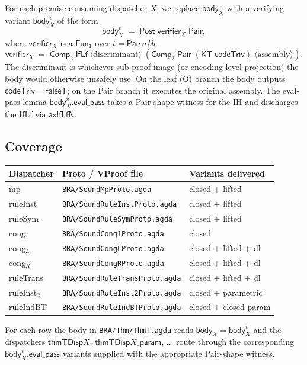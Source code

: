 \documentclass[11pt]{article}
\newcommand{\FunOne}{\mathsf{Fun_1}}
\newcommand{\Pair}{\mathsf{Pair}}
\newcommand{\IfLf}{\mathsf{IfLf}}
\newcommand{\Comp}{\mathsf{Comp}}
\newcommand{\Post}{\mathsf{Post}}
\newcommand{\KT}{\mathsf{KT}}
\newcommand{\codeTriv}{\mathsf{codeTriv}}
\newcommand{\falseT}{\mathsf{falseT}}
\begin{document}
For each premise-consuming dispatcher $X$, we replace
$\mathsf{body}_X$ with a verifying variant
$\mathsf{body}_X^v$ of the form
\[
\mathsf{body}_X^v \;=\; \Post\;\mathsf{verifier}_X\;\Pair,
\]
where $\mathsf{verifier}_X$ is a $\FunOne$ over $t = \Pair\,a\,bb$:
\[
\mathsf{verifier}_X
\;=\;\Comp_2\;\IfLf\;\langle\text{discriminant}\rangle\;
              (\Comp_2\;\Pair\;(\KT\;\codeTriv)\;\langle\text{assembly}\rangle).
\]
The discriminant is whichever sub-proof image (or encoding-level
projection) the body would otherwise unsafely use.  On the leaf
($\mathsf{O}$) branch the body outputs $\codeTriv = \falseT$; on the
Pair branch it executes the original assembly.  The eval-pass lemma
$\mathsf{body}_X^v\!.\mathsf{eval\_pass}$ takes a Pair-shape
witness for the IH and discharges the IfLf via $\mathsf{axIfLfN}$.

\subsection{Coverage}

\begin{center}
\renewcommand{\arraystretch}{1.05}
\begin{tabular}{lll}
\hline
Dispatcher & Proto / VProof file & Variants delivered \\
\hline
mp           & \verb|BRA/SoundMpProto.agda|         & closed + lifted \\
ruleInst     & \verb|BRA/SoundRuleInstProto.agda|   & closed + lifted \\
ruleSym      & \verb|BRA/SoundRuleSymProto.agda|    & closed + lifted \\
cong$_1$     & \verb|BRA/SoundCong1Proto.agda|      & closed \\
cong$_L$     & \verb|BRA/SoundCongLProto.agda|      & closed + lifted + dl \\
cong$_R$     & \verb|BRA/SoundCongRProto.agda|     & closed + lifted + dl \\
ruleTrans    & \verb|BRA/SoundRuleTransProto.agda|  & closed + lifted + dl \\
ruleInst$_2$ & \verb|BRA/SoundRuleInst2Proto.agda|  & closed + parametric \\
ruleIndBT    & \verb|BRA/SoundRuleIndBTProto.agda|  & closed + closed-param \\
\hline
\end{tabular}
\end{center}

For each row the body in \verb|BRA/Thm/ThmT.agda| reads
$\mathsf{body}_X = \mathsf{body}_X^v$ and the dispatchers
$\mathsf{thmTDisp}X$, $\mathsf{thmTDisp}X\_\mathsf{param}$,
\ldots\ route through the corresponding $\mathsf{body}_X^v\!.\mathsf{eval\_pass}$
variants supplied with the appropriate Pair-shape witness.
\end{document}
